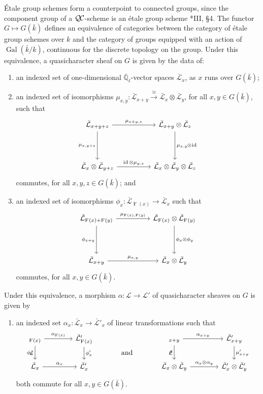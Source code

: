 \documentclass{amsart}
\makeatletter
\theoremstyle{plain}
\theoremstyle{definition}
\theoremstyle{remark}
\newcommand{\EE}{\mathbb{\bar Q}_\ell}
\newcommand{\bFq}{\bar{k}}
\newcommand{\Fq}{k}
\DeclareMathOperator{\Gal}{Gal}
\newcommand{\Frob}[1]{\operatorname{F}_{#1}}
\DeclareMathOperator{\id}{id}
\newcommand{\iso}{{\ \cong\ }}
\newcommand{\qcs}[1]{{\mathcal{#1}}}
\newcommand{\gqcs}[1]{{\mathcal{\bar #1}}}
\newcommand{\QC}{{\mathcal{Q\hskip-0.8pt C}}}
\newcommand{\labitem}[2]{
\def\@itemlabel{\textbf{#1}}
\item
\def\@currentlabel{#1}\label{#2}}
\newcommand{\tight}[3]{\hspace{-#1pt}{#2}\hspace{-#3pt}}
\makeatother
\begin{document}
\'Etale group schemes form a counterpoint to connected groups,
since the component group of a $\QC$-scheme
is an \'etale group scheme \cite{vdGeer-Moonen:AbelianVarieties}*{III, \S 4}.
The functor $G \mapsto G(\bFq)$ defines an equivalence of categories
between the category of \'etale group schemes over $\Fq$ and the category of groups equipped
with an action of $\Gal(\bFq/\Fq)$, continuous for the discrete topology on the group.
Under this equivalence, a quasicharacter sheaf on $G$ is given by the data of:
\begin{enumerate}
 \labitem{(qc.1)}{qc.1} an indexed set of one-dimensional
  $\EE$-vector spaces $\gqcs{L}_x$, as $x$ runs over
  $G(\bFq)$;

 \labitem{(qc.2)}{qc.2} an indexed set of isomorphisms
  $\mu_{x,y} : \gqcs{L}_{x+y} \xrightarrow{\iso} \gqcs{L}_{x} \otimes\gqcs{L}_{y}$,
  for all $x,y \in G(\bFq)$, such that
  \[
   \begin{tikzcd}[row sep=40]
    \gqcs{L}_{x+y+z} \arrow{rr}{\mu_{x+y,z}} \arrow[swap]{d}{\mu_{x,y+z}}
    && \gqcs{L}_{x+y}\otimes\gqcs{L}_{z} \dar{\mu_{x,y} \tight{0.5}{\otimes}{1} \id} \\
    \gqcs{L}_{x} \otimes\gqcs{L}_{y+z} \arrow{rr}{\id \otimes\mu_{y,z}}
    && \gqcs{L}_{x} \otimes\gqcs{L}_{y} \otimes\gqcs{L}_{z}
   \end{tikzcd}
  \]
  commutes, for all $x,y,z\in G(\bFq)$; and
 \labitem{(qc.3)}{qc.3} an indexed set of isomorphisms $\phi_{x} : \gqcs{L}_{\Frob{}(x)} \to \gqcs{L}_x$
  such that
  \[
   \begin{tikzcd}[row sep=40]
    \gqcs{L}_{\Frob{}(x)+\Frob{}(y)} \arrow[swap]{d}{\phi_{x+y}} \arrow{rr}{\mu_{\Frob{}(x),\Frob{}(y)}}
    && \gqcs{L}_{\Frob{}(x)}\otimes\gqcs{L}_{\Frob{}(y)} \dar{\phi_x \tight{0}{\otimes}{0} \phi_y} \\
    \gqcs{L}_{x+y} \arrow{rr}{\mu_{x,y}}
    && \gqcs{L}_x \otimes\gqcs{L}_y
   \end{tikzcd}
  \]
  commutes, for all $x,y\in G(\bFq)$.
\end{enumerate}
Under this equivalence, a morphism $\alpha : \qcs{L} \to \qcs{L'}$ of quasicharacter sheaves on $G$ is given by 
\begin{enumerate}
 \labitem{(qc.4)}{qc.4} an indexed set $\alpha_x : \gqcs{L}_x \to \gqcs{L'}_x$
  of linear transformations such that
  \[
   \begin{tikzcd}[column sep=40]
    \arrow[swap]{d}{\phi_x} \gqcs{L}_{\Frob{}(x)} \rar{\alpha_{\Frob{}(x)}} & \gqcs{L'}_{\Frob{}(x)} \dar{\phi_x'}
    &\arrow[draw=none]{d}[pos=.4,description]{\text{\normalsize{and}}}
    & \arrow[swap]{d}{\mu} \gqcs{L}_{x+y} \rar{\alpha_{x+y}} & \gqcs{L'}_{x+y} \dar{\mu'_{x+y}} \\
    \gqcs{L}_x \rar{\alpha_x} & \gqcs{L'}_x
    & {} & \gqcs{L}_x\otimes\gqcs{L}_y \rar{\alpha_x\otimes\alpha_y} & \gqcs{L'}_x \otimes\gqcs{L'}_y
   \end{tikzcd}
  \]
  both commute for all $x, y \in G(\bFq)$.
\end{enumerate}
\end{document}
